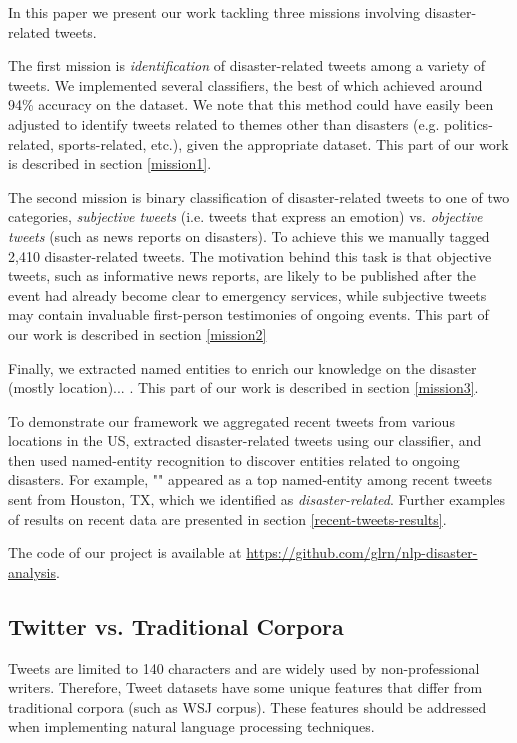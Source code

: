 \documentclass[letterpaper,twocolumn,10pt]{article}
\begin{document}
In this paper we present our work tackling three missions involving disaster-related tweets.

The first mission is \textit{identification} of disaster-related tweets among a variety of tweets. We implemented several classifiers, the best of which achieved around 94\% accuracy on the dataset. We note that this method could have easily been adjusted to identify tweets related to themes other than disasters (e.g. politics-related, sports-related, etc.), given the appropriate dataset. This part of our work is described in section \ref{mission1}.

The second mission is binary classification of disaster-related tweets to one of two categories, \textit{subjective tweets} (i.e. tweets that express an emotion) vs. \textit{objective tweets} (such as news reports on disasters). To achieve this we manually tagged 2,410 disaster-related tweets. The motivation behind this task is that objective tweets, such as informative news reports, are likely to be published after the event had already become clear to emergency services, while subjective tweets may contain invaluable first-person testimonies of ongoing events. This part of our work is described in section \ref{mission2}

Finally, we extracted named entities to enrich our knowledge on the disaster (mostly location)... . This part of our work is described in section \ref{mission3}.

To demonstrate our framework we aggregated recent tweets from various locations in the US, extracted disaster-related tweets using our classifier, and then used named-entity recognition to discover entities related to ongoing disasters. For example, "" appeared as a top named-entity among recent tweets sent from Houston, TX, which we identified as \textit{disaster-related}. Further examples of results on recent data are presented in section \ref{recent-tweets-results}.

The code of our project is available at \url{https://github.com/glrn/nlp-disaster-analysis}.

\subsection{Twitter vs. Traditional Corpora}

Tweets are limited to 140 characters and are widely used by non-professional writers. Therefore, Tweet datasets have some unique features that differ from traditional corpora (such as WSJ corpus). These features should be addressed when implementing natural language processing techniques.
\end{document}
